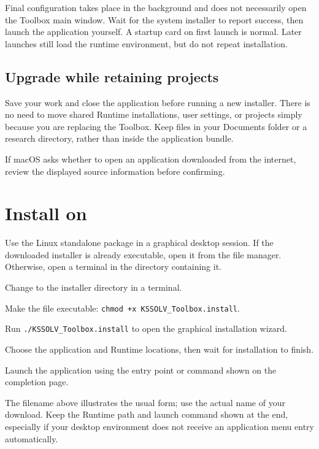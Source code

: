 Final configuration takes place in the background and does not necessarily open the Toolbox main window. Wait for the system installer to report success, then launch the application yourself. A startup card on first launch is normal. Later launches still load the runtime environment, but do not repeat installation.

\subsection{Upgrade while retaining projects}

Save your work and close the application before running a new installer. There is no need to move shared Runtime installations, user settings, or projects simply because you are replacing the Toolbox. Keep  files in your Documents folder or a research directory, rather than inside the application bundle.

If macOS asks whether to open an application downloaded from the internet, review the displayed source information before confirming.

\section{Install on }

Use the Linux standalone package in a graphical desktop session. If the downloaded installer is already executable, open it from the file manager. Otherwise, open a terminal in the directory containing it.

\begin{steps}
\item Change to the installer directory in a terminal.
\item Make the file executable: \texttt{chmod +x KSSOLV\_Toolbox.install}.
\item Run \texttt{./KSSOLV\_Toolbox.install} to open the graphical installation wizard.
\item Choose the application and Runtime locations, then wait for installation to finish.
\item Launch the application using the entry point or command shown on the completion page.
\end{steps}

The filename above illustrates the usual form; use the actual name of your download. Keep the Runtime path and launch command shown at the end, especially if your desktop environment does not receive an application menu entry automatically.

